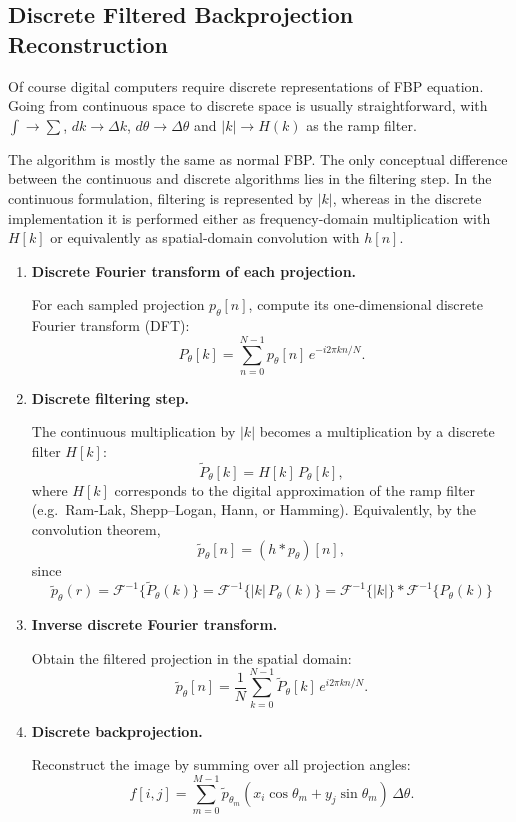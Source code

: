 \documentclass[../../../main.tex]{subfiles}
\begin{document}
\subsection{Discrete Filtered Backprojection Reconstruction}
Of course digital computers require discrete representations of FBP equation.
Going from continuous space to discrete space is usually straightforward, with $\int \rightarrow \sum $, $dk\rightarrow\Delta k$, $d\theta\rightarrow\Delta \theta$ and $|k|\rightarrow H(k)$ as the ramp filter.

The algorithm is mostly the same as normal FBP.
The only conceptual difference between the continuous and discrete algorithms lies in the filtering step.
In the continuous formulation, filtering is represented by $|k|$,  whereas in the discrete implementation it is performed either as frequency-domain multiplication with $H[k]$ or equivalently as spatial-domain convolution with $h[n]$.
\begin{enumerate}
    \item \textbf{Discrete Fourier transform of each projection.}

          For each sampled projection $p_\theta[n]$, compute its one-dimensional discrete Fourier transform (DFT):
          \[
              P_\theta[k] = \sum_{n=0}^{N-1} p_\theta[n]\, e^{-i 2\pi kn / N}.
          \]

    \item \textbf{Discrete filtering step.}

          The continuous multiplication by $|k|$ becomes a multiplication by a discrete filter $H[k]$:
          \[
              \tilde{P}_\theta[k] = H[k]\, P_\theta[k],
          \]
          where $H[k]$ corresponds to the digital approximation of the ramp filter (e.g.\ Ram-Lak, Shepp–Logan, Hann, or Hamming).
          Equivalently, by the convolution theorem,
          \[
              \tilde{p}_\theta[n] = (h * p_\theta)[n],
          \]
          since
          \[
              \tilde{p}_{\theta}(r)
              = \mathcal{F}^{-1}\{\tilde{P}_{\theta}(k)\}
              = \mathcal{F}^{-1}\{|k|\,P_{\theta}(k)\}
              = \mathcal{F}^{-1}\{|k|\} * \mathcal{F}^{-1}\{P_{\theta}(k)\}
          \]

    \item \textbf{Inverse discrete Fourier transform.}

          Obtain the filtered projection in the spatial domain:
          \[
              \tilde{p}_\theta[n] = \frac{1}{N} \sum_{k=0}^{N-1} \tilde{P}_\theta[k]\, e^{i 2\pi kn / N}.
          \]

    \item \textbf{Discrete backprojection.}

          Reconstruct the image by summing over all projection angles:
          \[
              f[i,j] = \sum_{m=0}^{M-1} \tilde{p}_{\theta_m}(x_i\cos\theta_m + y_j\sin\theta_m)\, \Delta\theta.
          \]
\end{enumerate}
\end{document}
